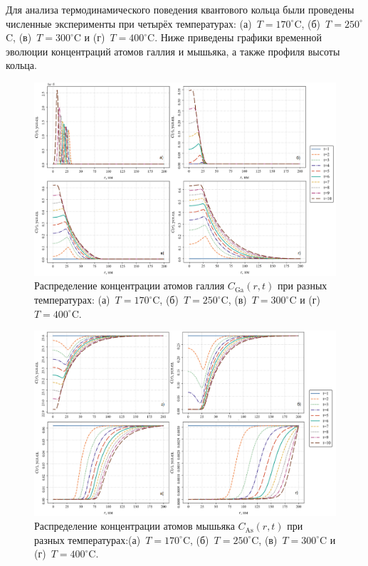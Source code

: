 \documentclass[14pt,oneside]{extarticle}
\begin{document}
Для анализа термодинамического поведения квантового кольца были проведены численные эксперименты при четырёх температурах: (а)~$T = 170^\circ$C, (б)~$T = 250^\circ$C, (в)~$T = 300^\circ$C и (г)~$T = 400^\circ$C. Ниже приведены графики временной эволюции концентраций атомов галлия и мышьяка, а также профиля высоты кольца.    

\begin{figure}
    \begin{center}
    \includegraphics[width=18cm]{images/C_Ga_t.png}
    \caption{\label{fig:c_ga_t} Распределение концентрации атомов галлия $C_{\text{Ga}}(r, t)$ при разных температурах: (а)~$T = 170^\circ$C, (б)~$T = 250^\circ$C, (в)~$T = 300^\circ$C и (г)~$T = 400^\circ$C.}
    \end{center}
\end{figure}

\begin{figure}
    \begin{center}
    \includegraphics[width=18cm]{images/C_As_t.png}
    \caption{\label{fig:c_as_t} Распределение концентрации атомов мышьяка $C_{\text{As}}(r, t)$ при разных температурах:(а)~$T = 170^\circ$C, (б)~$T = 250^\circ$C, (в)~$T = 300^\circ$C и (г)~$T = 400^\circ$C.}
    \end{center}
\end{figure}
\end{document}
